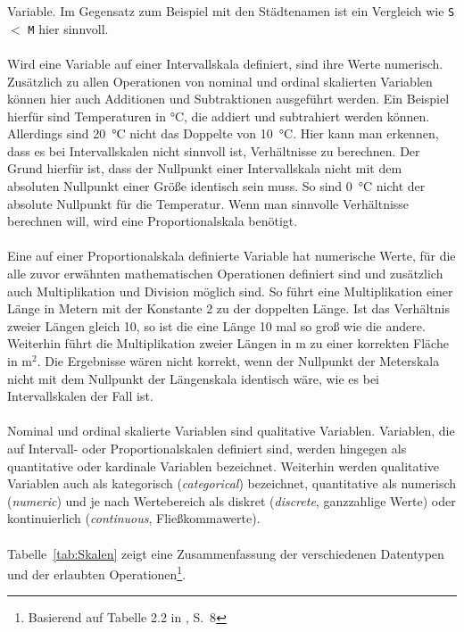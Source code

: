 Variable. Im Gegensatz zum Beispiel mit den Städtenamen ist ein Vergleich wie
\texttt{S} $<$ \texttt{M} hier sinnvoll. \\ \\
Wird eine Variable auf einer Intervallskala definiert, sind ihre Werte
numerisch.
Zusätzlich zu
allen Operationen von nominal und ordinal skalierten Variablen können hier auch
Additionen und Subtraktionen ausgeführt werden. Ein Beispiel hierfür sind
Temperaturen in °C, die addiert und subtrahiert werden können. Allerdings sind
20~°C nicht das Doppelte von 10~°C. Hier kann man erkennen, dass es bei
Intervallskalen nicht sinnvoll ist, Verhältnisse zu berechnen. Der Grund
hierfür ist, dass der Nullpunkt einer Intervallskala nicht mit dem absoluten
Nullpunkt einer Größe identisch sein muss. So sind 0~°C nicht der absolute
Nullpunkt für die Temperatur. Wenn man sinnvolle Verhältnisse berechnen will,
wird eine Proportionalskala benötigt. \\ \\
Eine auf einer Proportionalskala definierte Variable hat numerische Werte, für
die alle zuvor erwähnten mathematischen Operationen definiert sind und
zusätzlich auch Multiplikation und Division möglich sind.
So führt eine
Multiplikation einer Länge in Metern mit der Konstante 2 zu der doppelten Länge.
Ist das Verhältnis zweier Längen gleich 10, so ist die eine Länge 10
mal so groß wie die andere. Weiterhin führt die Multiplikation zweier Längen
in m zu einer korrekten Fläche in $\textrm{m}^2$. Die Ergebnisse wären nicht
korrekt, wenn der Nullpunkt der Meterskala nicht mit dem Nullpunkt der
Längenskala identisch wäre, wie es bei Intervallskalen der Fall ist. \\ \\
Nominal und ordinal skalierte Variablen sind qualitative Variablen.
Variablen, die auf Intervall- oder Proportionalskalen definiert sind, werden
hingegen als quantitative oder kardinale Variablen bezeichnet.
Weiterhin werden qualitative Variablen auch als kategorisch
(\emph{categorical}) bezeichnet, quantitative als numerisch (\emph{numeric})
und je nach Wertebereich als diskret (\emph{discrete}, ganzzahlige Werte) oder
kontinuierlich (\emph{continuous}, Fließkommawerte). \\ \\
Tabelle~\ref{tab:Skalen} zeigt eine Zusammenfassung der verschiedenen Datentypen
und der erlaubten Operationen\footnote{
Basierend auf Tabelle 2.2 in \cite{Runkler}, S.~8}.

